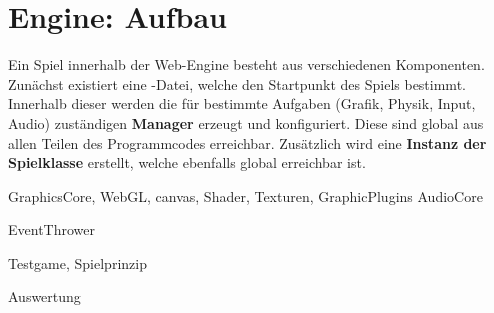 \part{Engine: Aufbau}

Ein Spiel innerhalb der Web-Engine besteht aus verschiedenen Komponenten. Zunächst existiert eine -Datei, welche den Startpunkt des Spiels bestimmt. Innerhalb dieser werden die für bestimmte Aufgaben (Grafik, Physik, Input, Audio) zuständigen \textbf{Manager} erzeugt und konfiguriert. Diese sind global aus allen Teilen des Programmcodes erreichbar. Zusätzlich wird eine \textbf{Instanz der Spielklasse} erstellt, welche ebenfalls global erreichbar ist.











GraphicsCore, WebGL, canvas, Shader, Texturen, GraphicPlugins
AudioCore

EventThrower

Testgame, Spielprinzip

Auswertung